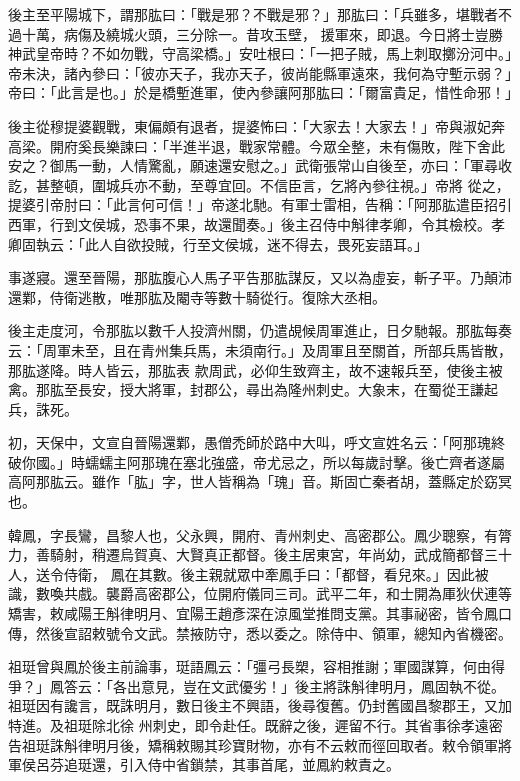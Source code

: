 \begin{pinyinscope}
 後主至平陽城下，謂那肱曰：「戰是邪？不戰是邪？」那肱曰：「兵雖多，堪戰者不過十萬，病傷及繞城火頭，三分除一。昔攻玉壁，
 援軍來，即退。今日將士豈勝神武皇帝時？不如勿戰，守高梁橋。」安吐根曰：「一把子賊，馬上刺取擲汾河中。」帝未決，諸內參曰：「彼亦天子，我亦天子，彼尚能縣軍遠來，我何為守塹示弱？」帝曰：「此言是也。」於是橋塹進軍，使內參讓阿那肱曰：「爾富貴足，惜性命邪！」



 後主從穆提婆觀戰，東偏頗有退者，提婆怖曰：「大家去！大家去！」帝與淑妃奔高梁。開府奚長樂諫曰：「半進半退，戰家常體。今眾全整，未有傷敗，陛下舍此安之？御馬一動，人情驚亂，願速還安慰之。」武衛張常山自後至，亦曰：「軍尋收訖，甚整頓，圍城兵亦不動，至尊宜回。不信臣言，乞將內參往視。」帝將
 從之，提婆引帝肘曰：「此言何可信！」帝遂北馳。有軍士雷相，告稱：「阿那肱遣臣招引西軍，行到文侯城，恐事不果，故還聞奏。」後主召侍中斛律孝卿，令其檢校。孝卿固執云：「此人自欲投賊，行至文侯城，迷不得去，畏死妄語耳。」



 事遂寢。還至晉陽，那肱腹心人馬子平告那肱謀反，又以為虛妄，斬子平。乃顛沛還鄴，侍衛逃散，唯那肱及閹寺等數十騎從行。復除大丞相。



 後主走度河，令那肱以數千人投濟州關，仍遣覘候周軍進止，日夕馳報。那肱每奏云：「周軍未至，且在青州集兵馬，未須南行。」及周軍且至關首，所部兵馬皆散，那肱遂降。時人皆云，那肱表
 款周武，必仰生致齊主，故不速報兵至，使後主被禽。那肱至長安，授大將軍，封郡公，尋出為隆州刺史。大象末，在蜀從王謙起兵，誅死。



 初，天保中，文宣自晉陽還鄴，愚僧禿師於路中大叫，呼文宣姓名云：「阿那瑰終破你國。」時蠕蠕主阿那瑰在塞北強盛，帝尤忌之，所以每歲討擊。後亡齊者遂屬高阿那肱云。雖作「肱」字，世人皆稱為「瑰」音。斯固亡秦者胡，蓋縣定於窈冥也。



 韓鳳，字長鸞，昌黎人也，父永興，開府、青州刺史、高密郡公。鳳少聰察，有膂力，善騎射，稍遷烏賀真、大賢真正都督。後主居東宮，年尚幼，武成簡都督三十人，送令侍衛，
 鳳在其數。後主親就眾中牽鳳手曰：「都督，看兒來。」因此被識，數喚共戲。襲爵高密郡公，位開府儀同三司。武平二年，和士開為厙狄伏連等矯害，敕咸陽王斛律明月、宜陽王趙彥深在涼風堂推問支黨。其事祕密，皆令鳳口傳，然後宣詔敕號令文武。禁掖防守，悉以委之。除侍中、領軍，總知內省機密。



 祖珽曾與鳳於後主前論事，珽語鳳云：「彊弓長槊，容相推謝；軍國謀算，何由得爭？」鳳答云：「各出意見，豈在文武優劣！」後主將誅斛律明月，鳳固執不從。祖珽因有讒言，既誅明月，數日後主不興語，後尋復舊。仍封舊國昌黎郡王，又加特進。及祖珽除北徐
 州刺史，即令赴任。既辭之後，遲留不行。其省事徐孝遠密告祖珽誅斛律明月後，矯稱敕賜其珍寶財物，亦有不云敕而徑回取者。敕令領軍將軍侯呂芬追珽還，引入侍中省鎖禁，其事首尾，並鳳約敕責之。




\end{pinyinscope}
